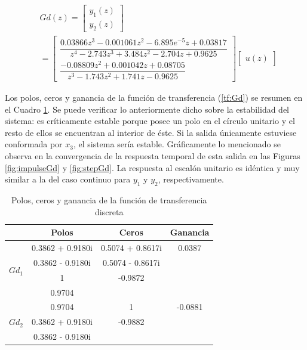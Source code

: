 \documentclass[journal]{IEEEtran}
\begin{document}
\begin{equation}
\label{tf:Gd}
\begin{aligned}
&Gd(z) = \begin{bmatrix}
	y_1(z)\\
	y_2(z)
\end{bmatrix} \\
& = 
\begin{bmatrix}
\dfrac{0.03866 z^3 - 0.001061 z^2 - 6.895e^{-5} z + 0.03817}{z^4 - 2.743 z^3 + 3.484 z^2 - 2.704 z + 0.9625}\\
\dfrac{-0.08809 z^2 + 0.001042 z + 0.08705}{z^3 - 1.743 z^2 + 1.741 z - 0.9625}
\end{bmatrix}
\begin{bmatrix}
	u(z)
\end{bmatrix}
\end{aligned}
\end{equation}
\textbf{}

Los polos, ceros y ganancia de la función de transferencia (\ref{tf:Gd}) se resumen en el Cuadro \ref{tab: pzg tfd}. Se puede verificar lo anteriormente dicho sobre la estabilidad del sistema: es críticamente estable porque posee un polo en el círculo unitario y el resto de ellos se encuentran al interior de éste. Si la salida únicamente estuviese conformada por $x_3$, el sistema sería estable. Gráficamente lo mencionado se observa en la convergencia de la respuesta temporal de esta salida en las Figuras \ref{fig:impulseGd} y \ref{fig:stepGd}. La respuesta al escalón unitario es idéntica y muy similar a la del caso continuo para $y_1$ y $y_2$, respectivamente.\\

\begin{table}[!h]
\centering
\caption{Polos, ceros y ganancia de la función de transferencia discreta}
\label{tab: pzg tfd}
\begin{tabular}{@{}lccc@{}}
\toprule
                  & Polos & Ceros             & Ganancia          \\ \midrule
\multirow{4}{*}{$Gd_1$} & 0.3862 + 0.9180i & 0.5074 + 0.8617i & 0.0387 \\
                  & 0.3862 - 0.9180i & 0.5074 - 0.8617i &                   \\
                  & 1 & -0.9872 &                   \\
                  & 0.9704 & &                   \\    
                 \midrule
\multirow{4}{*}{$Gd_2$} & 0.9704 & 1 & -0.0881 \\
                  & 0.3862 + 0.9180i & -0.9882 &                   \\  
                  &  0.3862 - 0.9180i &  &
                  \\ \bottomrule
\end{tabular}
\end{table}
\end{document}
